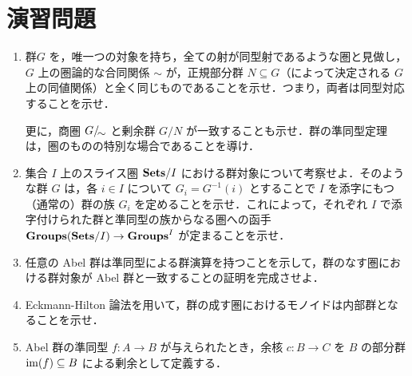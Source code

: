\section{演習問題}
\begin{enumerate}
 \item 群$G$ を，唯一つの対象を持ち，全ての射が同型射であるような圏と見做し，$G$ 上の圏論的な合同関係 $\sim$ が，正規部分群 $N \subseteq G$（によって決定される $G$ 上の同値関係）と全く同じものであることを示せ．つまり，両者は同型対応することを示せ．

       更に，商圏 $\quot{G}{\sim}$ と剰余群 $G/N$ が一致することも示せ．群の準同型定理は，圏のものの特別な場合であることを導け．
 \item 集合 $I$ 上のスライス圏 $\mathbf{Sets}/I$ における群対象について考察せよ．そのような群 $G$ は，各 $i \in I$ について $G_i = G^{-1}(i)$ とすることで $I$ を添字にもつ（通常の）群の族 $G_i$ を定めることを示せ．これによって，それぞれ $I$ で添字付けられた群と準同型の族からなる圏への函手 $\mathbf{Groups}(\mathbf{Sets}/I) \to \mathbf{Groups}^I$ が定まることを示せ．
 \item 任意の Abel 群は準同型による群演算を持つことを示して，群のなす圏における群対象が Abel 群と一致することの証明を完成させよ．
 \item Eckmann-Hilton 論法を用いて，群の成す圏におけるモノイドは内部群となることを示せ．
 \item Abel 群の準同型 $f: A \to B$ が与えられたとき，余核 $c: B \to C$ を $B$ の部分群 $\mathrm{im}(f) \subseteq B$ による剰余として定義する．


\end{enumerate}
